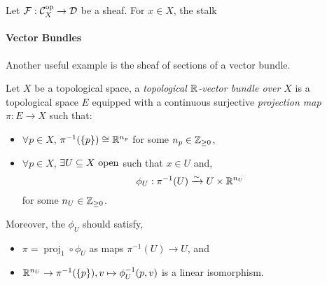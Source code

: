 \documentclass[000-main.tex]{subfiles}
\begin{document}
\begin{definition}
  Let $\mathcal{F}: \mathcal{C}_X^{\text{op}}\to \mathcal{D}$ be a sheaf.
  For $x\in X$, the stalk
\end{definition}

\paragraph{Vector Bundles}%

Another useful example is the sheaf of sections of a vector bundle.
\begin{definition}
  Let $X$ be a topological space, a \emph{topological $\mathbb{R}$-vector bundle over $X$} is a topological space $E$ equipped with a continuous surjective \emph{projection map} $\pi: E \to X$ such that:
  \begin{itemize}
    \item $\forall p\in X$, $\pi^{-1}(\{p\}) \cong \mathbb{R}^{n_p}$ for some $n_p\in\mathbb{Z}_{\geq0}$,
    \item $\forall p\in X$, $\exists U\subseteq X\text{ open}$ such that $x\in U$ and,
          \begin{displaymath}
            \phi_U: \pi^{-1}(U) \xrightarrow{\sim} U\times \mathbb{R}^{n_U}
          \end{displaymath}
          for some $n_U\in\mathbb{Z}_{\geq0}$.
  \end{itemize}
  Moreover, the $\phi_U$ should satisfy,
  \begin{itemize}
    \item \(\pi = \operatorname{proj}_1\circ \phi_U\) as maps $\pi^{-1}(U) \to U$, and
    \item $\mathbb{R}^{n_U}\to \pi^{-1}(\{p\}), v \mapsto \phi^{-1}_U(p, v)$ is a linear isomorphism.
  \end{itemize}
\end{definition}
\end{document}
